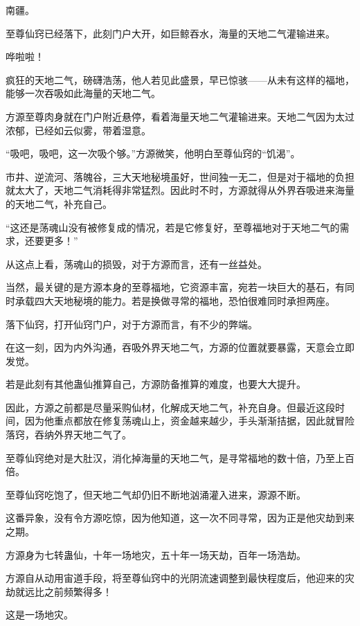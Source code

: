
\begin{this_body}

南疆。

至尊仙窍已经落下，此刻门户大开，如巨鲸吞水，海量的天地二气灌输进来。

哗啦啦！

疯狂的天地二气，磅礴浩荡，他人若见此盛景，早已惊骇——从未有这样的福地，能够一次吞吸如此海量的天地二气。

方源至尊肉身就在门户附近悬停，看着海量天地二气灌输进来。天地二气因为太过浓郁，已经如云似雾，带着湿意。

“吸吧，吸吧，这一次吸个够。”方源微笑，他明白至尊仙窍的“饥渴”。

市井、逆流河、落魄谷，三大天地秘境虽好，世间独一无二，但是对于福地的负担就太大了，天地二气消耗得非常猛烈。因此时不时，方源就得从外界吞吸进来海量的天地二气，补充自己。

“这还是荡魂山没有被修复成的情况，若是它修复好，至尊福地对于天地二气的需求，还要更多！”

从这点上看，荡魂山的损毁，对于方源而言，还有一丝益处。

当然，最关键的是方源本身的至尊福地，它资源丰富，宛若一块巨大的基石，有同时承载四大天地秘境的能力。若是换做寻常的福地，恐怕很难同时承担两座。

落下仙窍，打开仙窍门户，对于方源而言，有不少的弊端。

在这一刻，因为内外沟通，吞吸外界天地二气，方源的位置就要暴露，天意会立即发觉。

若是此刻有其他蛊仙推算自己，方源防备推算的难度，也要大大提升。

因此，方源之前都是尽量采购仙材，化解成天地二气，补充自身。但最近这段时间，因为他重点都放在修复荡魂山上，资金越来越少，手头渐渐拮据，因此就冒险落窍，吞纳外界天地二气了。

至尊仙窍绝对是大肚汉，消化掉海量的天地二气，是寻常福地的数十倍，乃至上百倍。

至尊仙窍吃饱了，但天地二气却仍旧不断地汹涌灌入进来，源源不断。

这番异象，没有令方源吃惊，因为他知道，这一次不同寻常，因为正是他灾劫到来之期。

方源身为七转蛊仙，十年一场地灾，五十年一场天劫，百年一场浩劫。

方源自从动用宙道手段，将至尊仙窍中的光阴流速调整到最快程度后，他迎来的灾劫就远比之前频繁得多！

这是一场地灾。


\end{this_body}
